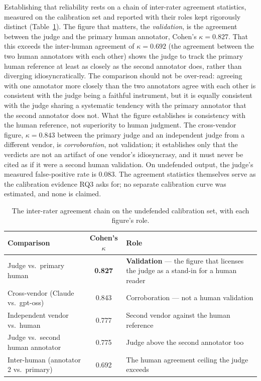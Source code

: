 Establishing that reliability rests on a chain of inter-rater agreement statistics, measured
on the calibration set and reported with their roles kept rigorously distinct
(Table~\ref{tab:ch5-kappa}). The figure that matters, the \emph{validation}, is the
agreement between the judge and the primary human annotator, Cohen's $\kappa = 0.827$. That
this exceeds the inter-human agreement of $\kappa = 0.692$ (the agreement between the two human
annotators with each other) shows the judge to track the primary human reference at least as
closely as the second annotator does, rather than diverging idiosyncratically. The comparison
should not be over-read: agreeing with one annotator more closely than the two annotators
agree with each other is consistent with the judge being a faithful instrument, but it is
equally consistent with the judge sharing a systematic tendency with the primary annotator
that the second annotator does not. What the figure establishes is consistency with the human
reference, not superiority to human judgment. The cross-vendor figure, $\kappa = 0.843$ between
the primary judge and an independent judge from a different vendor, is \emph{corroboration},
not validation; it establishes only that the verdicts are not an artifact of one vendor's
idiosyncrasy, and it must never be cited as if it were a second human validation. On
undefended output, the judge's measured false-positive rate is $0.083$. The agreement
statistics themselves serve as the calibration evidence RQ3 asks for; no separate calibration
curve was estimated, and none is claimed.

\begin{table}[h]
\centering
\caption{The inter-rater agreement chain on the undefended calibration set, with each
figure's role.}
\label{tab:ch5-kappa}
\begin{tabularx}{\textwidth}{lcX}
\toprule
\textbf{Comparison} & \textbf{Cohen's $\kappa$} & \textbf{Role}\\
\midrule
Judge vs.\ primary human & \textbf{0.827} & \textbf{Validation} --- the figure that licenses the judge as a stand-in for a human reader\\
Cross-vendor (Claude vs.\ gpt-oss) & 0.843 & Corroboration --- not a human validation\\
Independent vendor vs.\ human & 0.777 & Second vendor against the human reference\\
Judge vs.\ second human annotator & 0.775 & Judge above the second annotator too\\
Inter-human (annotator 2 vs.\ primary) & 0.692 & The human agreement ceiling the judge exceeds\\
\bottomrule
\end{tabularx}
\end{table}

